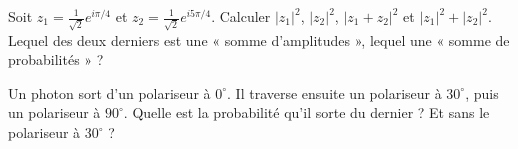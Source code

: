 \exercices
\begin{exercice}
Soit $z_1=\tfrac1{\sqrt2}e^{i\pi/4}$ et $z_2=\tfrac1{\sqrt2}e^{i5\pi/4}$. Calculer $|z_1|^2$, $|z_2|^2$, $|z_1+z_2|^2$ et $|z_1|^2+|z_2|^2$. Lequel des deux derniers est une « somme d'amplitudes », lequel une « somme de probabilités » ?
\end{exercice}
\begin{exercice}
Un photon sort d'un polariseur à $0^\circ$. Il traverse ensuite un polariseur à $30^\circ$, puis un polariseur à $90^\circ$. Quelle est la probabilité qu'il sorte du dernier ? Et sans le polariseur à $30^\circ$ ?
\end{exercice}
